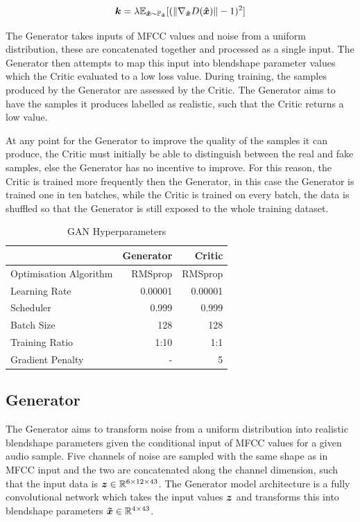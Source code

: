 \begin{equation}\label{eq:grad_penalty}
    {\boldsymbol{{k}}} = \lambda \mathbb{E}_{{\boldsymbol{{\hat{x}}}} \sim \mathbb{P}_{{\boldsymbol{{\hat{x}}}}}} 
            [(\| \nabla_{{\boldsymbol{{\hat{x}}}}} D({\boldsymbol{{\hat{x}}}}) \| - 1)^2]
\end{equation}

The Generator takes inputs of MFCC values and noise from a uniform distribution, these are concatenated together and processed as a single input.
The Generator then attempts to map this input into blendshape parameter values which the Critic evaluated to a low loss value. 
During training, the samples produced by the Generator are assessed by the Critic.
The Generator aims to have the samples it produces labelled as realistic, such that the Critic returns a low value.

At any point for the Generator to improve the quality of the samples it can produce, the Critic must initially be able to distinguish between the real and fake samples, else the Generator has no incentive to improve.
For this reason, the Critic is trained more frequently then the Generator, in this case the Generator is trained one in ten batches, while the Critic is trained on every batch, the data is shuffled so that the Generator is still exposed to the whole training dataset.

\begin{table}[h!]
\centering
    \begin{tabular}{l | r | r}
    & \textbf{Generator} & \textbf{Critic}\\
    \hline
    Optimisation Algorithm & RMSprop & RMSprop \\
    Learning Rate          & 0.00001 & 0.00001 \\
    Scheduler              & 0.999   & 0.999   \\
    Batch Size             & 128     & 128     \\
    Training Ratio         & 1:10    & 1:1     \\
    Gradient Penalty       & -       & 5       \\
    \end{tabular} 
    \caption{GAN Hyperparameters}\label{table:gan_hyperparameters}
\end{table}

\subsection{Generator}
The Generator aims to transform noise from a uniform distribution into realistic blendshape parameters given the conditional input of MFCC values for a given audio sample.
Five channels of noise are sampled with the same shape as in MFCC input and the two are concatenated along the channel dimension, such that the input data is ${\boldsymbol{{z}}} \in \mathbb{R}^{6 \times 12 \times 43}$.
The Generator model architecture is a fully convolutional network which takes the input values ${\boldsymbol{{z}}}$ and transforms this into blendshape parameters ${\boldsymbol{{\tilde{x}}}} \in \mathbb{R}^{4 \times 43}$.

